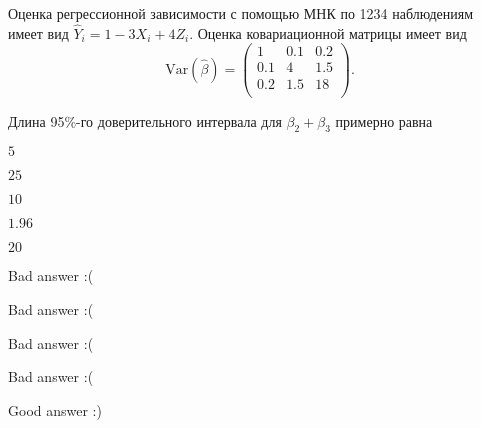 
\begin{question}
Оценка регрессионной зависимости с помощью МНК по 1234 наблюдениям имеет вид \(\hat Y_i = 1 - 3X_i + 4Z_i\). Оценка ковариационной матрицы имеет вид
\[
\mathrm{Var}(\hat \beta)=
\begin{pmatrix}
1 & 0.1 & 0.2 \\
0.1 & 4 & 1.5 \\
0.2 & 1.5 & 18 \\
\end{pmatrix}.
\]

Длина 95\%-го доверительного интервала для \(\beta_2 + \beta_3\) примерно равна
\begin{answerlist}
  \item \(5\)
  \item \(25\)
  \item \(10\)
  \item \(1.96\)
  \item \(20\)
\end{answerlist}
\end{question}

\begin{solution}
\begin{answerlist}
  \item Bad answer :(
  \item Bad answer :(
  \item Bad answer :(
  \item Bad answer :(
  \item Good answer :)
\end{answerlist}
\end{solution}

